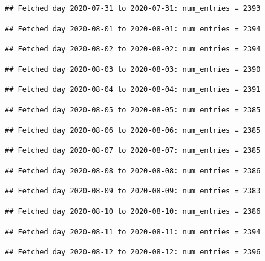 \documentclass[]{article}
\begin{document}
\begin{verbatim}
## Fetched day 2020-07-31 to 2020-07-31: num_entries = 2393
\end{verbatim}

\begin{verbatim}
## Fetched day 2020-08-01 to 2020-08-01: num_entries = 2394
\end{verbatim}

\begin{verbatim}
## Fetched day 2020-08-02 to 2020-08-02: num_entries = 2394
\end{verbatim}

\begin{verbatim}
## Fetched day 2020-08-03 to 2020-08-03: num_entries = 2390
\end{verbatim}

\begin{verbatim}
## Fetched day 2020-08-04 to 2020-08-04: num_entries = 2391
\end{verbatim}

\begin{verbatim}
## Fetched day 2020-08-05 to 2020-08-05: num_entries = 2385
\end{verbatim}

\begin{verbatim}
## Fetched day 2020-08-06 to 2020-08-06: num_entries = 2385
\end{verbatim}

\begin{verbatim}
## Fetched day 2020-08-07 to 2020-08-07: num_entries = 2385
\end{verbatim}

\begin{verbatim}
## Fetched day 2020-08-08 to 2020-08-08: num_entries = 2386
\end{verbatim}

\begin{verbatim}
## Fetched day 2020-08-09 to 2020-08-09: num_entries = 2383
\end{verbatim}

\begin{verbatim}
## Fetched day 2020-08-10 to 2020-08-10: num_entries = 2386
\end{verbatim}

\begin{verbatim}
## Fetched day 2020-08-11 to 2020-08-11: num_entries = 2394
\end{verbatim}

\begin{verbatim}
## Fetched day 2020-08-12 to 2020-08-12: num_entries = 2396
\end{verbatim}
\end{document}

